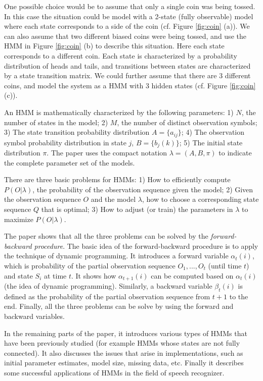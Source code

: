 One possible choice would be to assume that only a single coin was being tossed. In this case the situation could be model with a 2-state (fully observable) model where each state corresponds to a side of the coin (cf. Figure \ref{fig:coin} (a)). We can also assume that two different biased coins were being tossed, and use the HMM in Figure \ref{fig:coin} (b) to describe this situation. Here each state corresponds to a different coin. Each state is characterized by a probability distribution of heads and tails, and transitions between states are characterized by a state transition matrix. We could further assume that there are 3 different coins, and model the system as a HMM with 3 hidden states (cf. Figure \ref{fig:coin} (c)).

An HMM is mathematically characterized by the following parameters: 1) $N$, the number of states in the model; 2) $M$, the number of distinct observation symbols; 3) The state transition probability distribution $A=\{a_{ij}\}$; 4) The observation symbol probability distribution in state $j$, $B = \{b_j(k)\}$; 5) The initial state distribution $\pi$. The paper uses the compact notation $\lambda = (A, B, \pi)$ to indicate the complete parameter set of the models.

There are three basic problems for HMMs: 1) How to efficiently compute $P(O| \lambda)$, the probability of the observation sequence given the model; 2) Given the observation sequence $O$ and the model $\lambda$, how to choose a corresponding state sequence $Q$ that is optimal; 3) How to adjust (or train) the parameters in $\lambda$ to maximize $P(O| \lambda)$.

The paper shows that all the three problems can be solved by the \emph{forward-backward procedure}. The basic idea of the forward-backward procedure is to apply the technique of dynamic programming. It introduces a forward variable $\alpha_t(i)$, which is probability of the partial observation sequence $O_1, ..., O_t$ (until time $t$) and state $S_i$ at time $t$. It shows how $\alpha_{t+1}(i)$ can be computed based on $\alpha_t(i)$ (the idea of dynamic programming). Similarly, a backward variable $\beta_t(i)$ is defined as the probability of the partial observation sequence from $t+1$ to the end. Finally, all the three problems can be solve by using the forward and backward variables.

In the remaining parts of the paper, it introduces various types of HMMs that have been previously studied (for example HMMs whose states are not fully connected). It also discusses the issues that arise in implementations, such as initial parameter estimates, model size, missing data, etc. Finally it describes some successful applications of HMMs in the field of speech recognizer. 